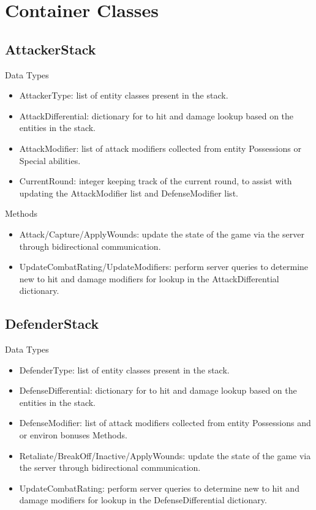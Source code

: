 \documentclass[12pt,letterpaper]{scrreprt}
\begin{document}
\chapter{Container Classes}
	\section{AttackerStack}
	Data Types
	\begin{itemize}
		\item AttackerType: list of entity classes present in the stack.\
		\item AttackDifferential: dictionary for to hit and damage lookup based on the entities in the stack.\
		\item AttackModifier: list of attack modifiers collected from entity Possessions or Special abilities.\
		\item CurrentRound: integer keeping track of the current round, to assist with updating the AttackModifier list and DefenseModifier list.
	\end{itemize}
	Methods
	\begin{itemize}
		\item Attack/Capture/ApplyWounds: update the state of the game via the server through bidirectional communication.
		\item UpdateCombatRating/UpdateModifiers: perform server queries to determine new to hit and damage modifiers for lookup in the AttackDifferential dictionary.
	\end{itemize}
	\section{DefenderStack}
	Data Types
	\begin{itemize}
		\item DefenderType: list of entity classes present in the stack.
		\item DefenseDifferential: dictionary for to hit and damage lookup based on the entities in the stack.
		\item DefenseModifier: list of attack modifiers collected from entity Possessions and or environ bonuses
Methods.
		\item Retaliate/BreakOff/Inactive/ApplyWounds: update the state of the game via the server through bidirectional communication.
		\item UpdateCombatRating: perform server queries to determine new to hit and damage modifiers for lookup in the DefenseDifferential dictionary.
	\end{itemize}
\end{document}
